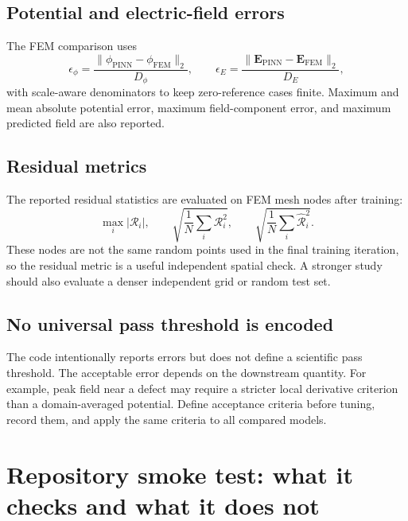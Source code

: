 \documentclass[11pt]{article}
\newcommand{\Evec}{\ensuremath{\mathbf{E}}}
\begin{document}
\subsection{Potential and electric-field errors}

The FEM comparison uses
\begin{equation}
\epsilon_{\phi}=\frac{\|\phi_{\mathrm{PINN}}-\phi_{\mathrm{FEM}}\|_2}{D_{\phi}},
\qquad
\epsilon_E=\frac{\|\Evec_{\mathrm{PINN}}-\Evec_{\mathrm{FEM}}\|_2}{D_E},
\end{equation}
with scale-aware denominators to keep zero-reference cases finite. Maximum and mean absolute potential error, maximum field-component error, and maximum predicted field are also reported.

\subsection{Residual metrics}

The reported residual statistics are evaluated on FEM mesh nodes after training:
\begin{equation}
\max_i|\mathcal{R}_i|,
\qquad
\sqrt{\frac{1}{N}\sum_i\mathcal{R}_i^2},
\qquad
\sqrt{\frac{1}{N}\sum_i\hat{\mathcal{R}}_i^2}.
\end{equation}
These nodes are not the same random points used in the final training iteration, so the residual metric is a useful independent spatial check. A stronger study should also evaluate a denser independent grid or random test set.

\subsection{No universal pass threshold is encoded}

The code intentionally reports errors but does not define a scientific pass threshold. The acceptable error depends on the downstream quantity. For example, peak field near a defect may require a stricter local derivative criterion than a domain-averaged potential. Define acceptance criteria before tuning, record them, and apply the same criteria to all compared models.

\section{Repository smoke test: what it checks and what it does not}
\end{document}
